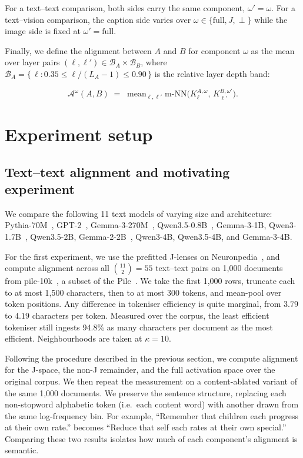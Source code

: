 \documentclass{article}
\newcommand{\fl}{\mathrm{full}}
\newcommand{\mnn}{\mathrm{m\text{-}NN}}
\begin{document}
For a text--text comparison, both sides carry the same component, $\omega' =
  \omega$. For a text--vision comparison, the caption side varies over $\omega
  \in \{\fl, J, \perp\}$ while the image side is fixed at $\omega' = \fl$.

Finally, we define the alignment between $A$ and $B$ for component $\omega$ as
the mean over layer pairs $(\ell, \ell') \in \mathcal{B}_A \times \mathcal{B}_B$, where
$\mathcal{B}_A = \{\,\ell : 0.35 \le \ell/(L_A-1) \le 0.90\,\}$ is the relative layer depth band:

\[
  \mathcal{A}^{\omega}(A,B) \;=\; \operatorname{mean}_{\ell, \ell'}\mnn\big(K^{A,\omega}_{\ell},\, K^{B,\omega'}_{\ell'}\big).
\]

\section{Experiment setup}
\subsection{Text--text alignment and motivating experiment}\label{subsec:texttextsetup}
We compare the following 11 text models of varying size and
architecture: Pythia-70M~\citep{biderman2023pythia}, GPT-2~\citep{radford2019language}, Gemma-3-270M~\citep{gemmateam2025gemma3technicalreport}, Qwen3.5-0.8B~\citep{qwen35blog}, Gemma-3-1B,
Qwen3-1.7B~\citep{qwen3}, Qwen3.5-2B, Gemma-2-2B~\citep{gemmateam2024gemma2improvingopen}, Qwen3-4B, Qwen3.5-4B, and Gemma-3-4B.

For the first experiment, we use the prefitted J-lenses on Neuronpedia~\citep{neuronpedia}, and compute alignment across all $\binom{11}{2}=55$
text--text pairs on 1,000 documents from pile-10k~\citep{Nanda2022Pile10K},
a subset of the Pile~\citep{gao2020pile800gbdatasetdiverse}. We take the first 1,000 rows, truncate each to at
most 1,500 characters, then to at most 300 tokens, and mean-pool over token
positions. Any difference in tokeniser efficiency is quite marginal, from
$3.79$ to $4.19$ characters per token. Measured over the corpus, the least efficient tokeniser still ingests 94.8\% as many characters per document as the most efficient. Neighbourhoods are taken at $\kappa=10$.

Following the procedure described in the previous section, we compute alignment for the J-space, the non-J remainder, and the full activation space
over the original corpus. We then repeat the measurement on a content-ablated
variant of the same 1,000 documents. We preserve the sentence structure, replacing each non-stopword alphabetic token (i.e.\ each content word) with another drawn from the same log-frequency bin. For example,
``Remember that children each progress at their own rate.'' becomes ``Reduce that
self each rates at their own special.''
Comparing these two results isolates how much of each component's alignment is
semantic.
\end{document}
